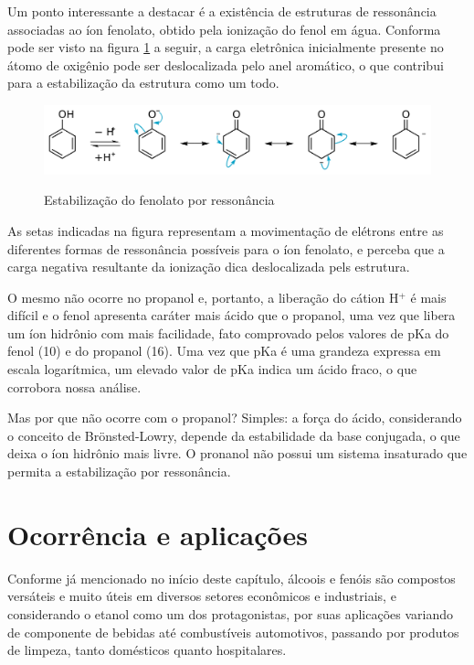 Um ponto interessante a destacar é a existência de estruturas de ressonância associadas ao íon fenolato, obtido pela ionização do fenol em água. Conforma pode ser visto na figura \ref{fig:fenolato} a seguir, a carga eletrônica inicialmente presente no átomo de oxigênio pode ser deslocalizada pelo anel aromático, o que contribui para a estabilização da estrutura como um todo.

\begin{figure}[h]
    \centering
    \caption{Estabilização do fenolato por ressonância}
    \vspace{0.5cm}
    \includegraphics[width=1\linewidth]{imagens/Phenol-phenolate_equilibrium.svg.png}
\label{fig:fenolato}
\end{figure}

As setas indicadas na figura representam a movimentação de elétrons entre as diferentes formas de ressonância possíveis para o íon fenolato, e perceba que a carga negativa resultante da ionização dica deslocalizada pels estrutura.

O mesmo não ocorre no propanol e, portanto, a liberação do cátion H{$^+$} é mais difícil e o fenol apresenta caráter mais ácido que o propanol, uma vez que libera um íon hidrônio com mais facilidade, fato comprovado pelos valores de pKa do fenol (10) e do propanol (16). Uma vez que pKa é uma grandeza expressa em escala logarítmica, um elevado valor de pKa indica um ácido fraco, o que corrobora nossa análise.

Mas por que não ocorre com o propanol? Simples: a força do ácido, considerando o conceito de Brönsted-Lowry, depende da estabilidade da base conjugada, o que deixa o íon hidrônio mais livre. O pronanol não possui um sistema insaturado que permita a estabilização por ressonância.


\section{Ocorrência e aplicações}
Conforme já mencionado no início deste capítulo, álcoois e fenóis são compostos versáteis e muito úteis em diversos setores econômicos e industriais, e considerando o etanol como um dos protagonistas, por suas aplicações variando de componente de bebidas até combustíveis automotivos, passando por produtos de limpeza, tanto domésticos quanto hospitalares.

